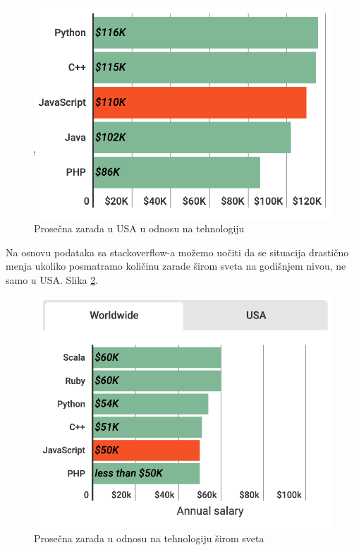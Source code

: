\documentclass[a4paper]{article}
\begin{document}
\begin{figure}[h!]
\begin{center}
\includegraphics[scale=0.6]{slike/salary1.png}
\end{center}
\caption{Prosečna zarada u USA u odnosu na tehnologiju}
\label{fig:salary1}
\end{figure}

Na osnovu podataka sa stackoverflow-a možemo uočiti da se situacija drastično menja ukoliko posmatramo količinu zarade širom sveta na godišnjem nivou, ne samo u USA. Slika \ref{fig:salary3}. 

\begin{figure}[h!]
\begin{center}
\includegraphics[scale=0.6]{slike/salary3.png}
\end{center}
\caption{Prosečna zarada u odnosu na tehnologiju širom sveta}
\label{fig:salary3}
\end{figure}
\end{document}
